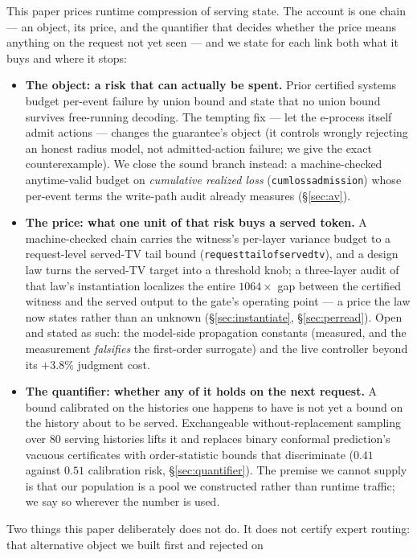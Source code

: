 \documentclass[11pt]{article}
\renewcommand{\_}{\WCorigunderscore\allowbreak}
\begin{document}
This paper prices runtime compression of serving state. The account is
one chain --- an object, its price, and the quantifier that decides
whether the price means anything on the request not yet seen --- and we
state for each link both what it buys and where it stops:
\begin{itemize}
\item \textbf{The object: a risk that can actually be spent.} Prior
  certified systems budget per-event failure by union bound and state
  that no union bound survives free-running decoding. The tempting fix
  --- let the e-process itself admit actions --- changes the
  guarantee's object (it controls wrongly rejecting an honest radius
  model, not admitted-action failure; we give the exact
  counterexample). We close the sound branch instead: a machine-checked
  anytime-valid budget on \emph{cumulative realized loss}
  (\texttt{cumloss\_admission}) whose per-event terms the write-path
  audit already measures (\S\ref{sec:av}).
\item \textbf{The price: what one unit of that risk buys a served
  token.} A machine-checked chain carries the witness's per-layer
  variance budget to a request-level served-TV tail bound
  (\texttt{request\_tail\_of\_served\_tv}), and a design law turns the
  served-TV target into a threshold knob; a three-layer audit of that
  law's instantiation localizes the entire $1064\times$ gap between the
  certified witness and the served output to the gate's operating point
  --- a price the law now states rather than an unknown
  (\S\ref{sec:instantiate}, \S\ref{sec:perread}). Open and stated as such: the model-side
  propagation constants (measured, and the measurement \emph{falsifies}
  the first-order surrogate) and the live controller beyond its
  $+3.8\%$ judgment cost.
\item \textbf{The quantifier: whether any of it holds on the next
  request.} A bound calibrated on the histories one happens to have is
  not yet a bound on the history about to be served. Exchangeable
  without-replacement sampling over $80$ serving histories lifts it and
  replaces binary conformal prediction's vacuous certificates with
  order-statistic bounds that discriminate ($0.41$ against $0.51$
  calibration risk, \S\ref{sec:quantifier}). The premise we cannot supply is that
  our population is a pool we constructed rather than runtime traffic;
  we say so wherever the number is used.
\end{itemize}
Two things this paper deliberately does not do. It does not certify
expert routing: that alternative object we built first and rejected on
\end{document}
